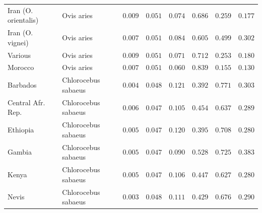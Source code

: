 \documentclass{article}
\begin{document}
\begin{center}
\begin{longtable*}{|l|l|r|r|r|r|r|r|}
            Iran (O. orientalis) &          Ovis aries &               $ 0.009$ &             $ 0.051$ &              $ 0.074$ &                                     $ 0.686$ &                       $ 0.259$ &                 $ 0.177$ \\
            Iran (O. vignei) &          Ovis aries &               $ 0.007$ &             $ 0.051$ &              $ 0.084$ &                                     $ 0.605$ &                       $ 0.499$ &                 $ 0.302$ \\
            Various &          Ovis aries &               $ 0.009$ &             $ 0.051$ &              $ 0.071$ &                                     $ 0.712$ &                       $ 0.253$ &                 $ 0.180$ \\
            Morocco &          Ovis aries &               $ 0.007$ &             $ 0.051$ &              $ 0.060$ &                                     $ 0.839$ &                       $ 0.155$ &                 $ 0.130$ \\
            Barbados & Chlorocebus sabaeus &               $ 0.004$ &             $ 0.048$ &              $ 0.121$ &                                     $ 0.392$ &                       $ 0.771$ &                 $ 0.303$ \\
            Central Afr. Rep. & Chlorocebus sabaeus &               $ 0.006$ &             $ 0.047$ &              $ 0.105$ &                                     $ 0.454$ &                       $ 0.637$ &                 $ 0.289$ \\
            Ethiopia & Chlorocebus sabaeus &               $ 0.005$ &             $ 0.047$ &              $ 0.120$ &                                     $ 0.395$ &                       $ 0.708$ &                 $ 0.280$ \\
            Gambia & Chlorocebus sabaeus &               $ 0.005$ &             $ 0.047$ &              $ 0.090$ &                                     $ 0.528$ &                       $ 0.725$ &                 $ 0.383$ \\
            Kenya & Chlorocebus sabaeus &               $ 0.005$ &             $ 0.047$ &              $ 0.106$ &                                     $ 0.447$ &                       $ 0.627$ &                 $ 0.280$ \\
            Nevis & Chlorocebus sabaeus &               $ 0.003$ &             $ 0.048$ &              $ 0.111$ &                                     $ 0.429$ &                       $ 0.676$ &                 $ 0.290$ \\

\end{longtable*}
\end{center}
\end{document}
